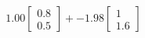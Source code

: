 \documentclass[preview]{standalone}
\begin{document}
\begin{align*}
1.00 \begin{bmatrix} 0.8 \\ 0.5 \end{bmatrix} + -1.98 \begin{bmatrix} 1 \\ 1.6 \end{bmatrix}
\end{align*}
\end{document}

